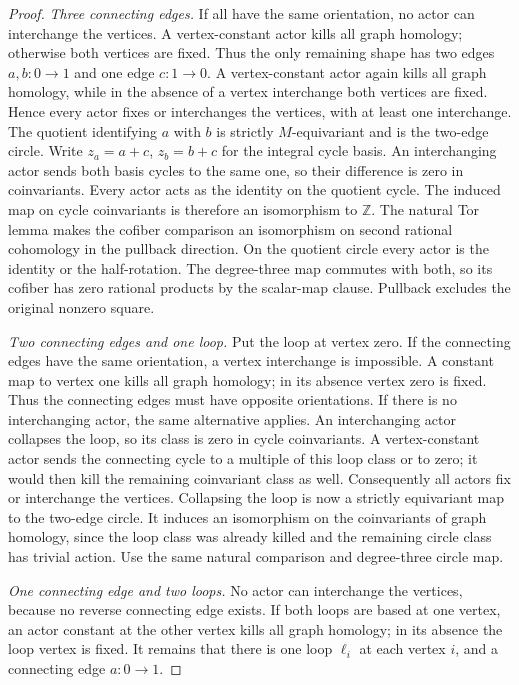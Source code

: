 \begin{proof}
\emph{Three connecting edges.}
If all have the same orientation, no actor can interchange the
vertices. A vertex-constant actor kills all graph homology;
otherwise both vertices are fixed. Thus the only remaining shape
has two edges $a,b:0\to1$ and one edge $c:1\to0$.
A vertex-constant actor again kills all graph homology, while in
the absence of a vertex interchange both vertices are fixed.
Hence every actor fixes or interchanges the vertices, with at least
one interchange. The quotient identifying $a$ with $b$ is strictly
$M$-equivariant and is the two-edge circle. Write
$z_a=a+c$, $z_b=b+c$ for the integral cycle basis.
An interchanging actor sends both basis cycles to the same one,
so their difference is zero in coinvariants. Every actor acts
as the identity on the quotient cycle. The induced map on cycle
coinvariants is therefore an isomorphism to $\mathbb Z$.
The natural Tor lemma makes the cofiber comparison an isomorphism
on second rational cohomology in the pullback direction.
On the quotient circle every actor is the identity or the
half-rotation. The degree-three map commutes with both, so its
cofiber has zero rational products by the scalar-map clause.
Pullback excludes the original nonzero square.

\emph{Two connecting edges and one loop.}
Put the loop at vertex zero. If the connecting edges have the
same orientation, a vertex interchange is impossible. A constant
map to vertex one kills all graph homology; in its absence vertex
zero is fixed. Thus the connecting edges must have opposite
orientations. If there is no interchanging actor, the same
alternative applies. An interchanging actor collapses the loop,
so its class is zero in cycle coinvariants. A vertex-constant
actor sends the connecting cycle to a multiple of this loop
class or to zero; it would then kill the remaining coinvariant
class as well. Consequently all actors fix or interchange the
vertices. Collapsing the loop is now a strictly equivariant map
to the two-edge circle. It induces an isomorphism on the
coinvariants of graph homology, since the loop class was already
killed and the remaining circle class has trivial action.
Use the same natural comparison and degree-three circle map.

\emph{One connecting edge and two loops.}
No actor can interchange the vertices, because no reverse
connecting edge exists. If both loops are based at one vertex,
an actor constant at the other vertex kills all graph homology;
in its absence the loop vertex is fixed. It remains that there
is one loop $\ell_i$ at each vertex $i$, and a connecting edge
$a:0\to1$.


\end{proof}
